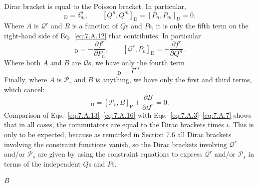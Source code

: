 Dirac bracket is equal to the Poisson bracket. In particular,
\begin{equation}
  [Q^n,P_m]_{\mathrm D}=\delta^n_m,\qquad
  [Q^n,Q^m]_{\mathrm D}=[P_n,P_m]_{\mathrm D}=0.
  \tag{7.A.13}\label{eq:7.A.13}
\end{equation}
Where $A$ is $\mathcal{Q}^r$ and $B$ is a function of $Q$s and $P$s, it is
only the fifth term on the right-hand side of Eq.~\eqref{eq:7.A.12} that contributes.
In particular
\begin{equation}
  [\mathcal{Q}^r,Q^n]_{\mathrm D}=-\frac{\partial f^r}{\partial P_n},
  \qquad
  [\mathcal{Q}^r,P_n]_{\mathrm D}=+\frac{\partial f^r}{\partial Q^n}.
  \tag{7.A.14}\label{eq:7.A.14}
\end{equation}
Where both $A$ and $B$ are $\mathcal{Q}$s, we have only the fourth term
\begin{equation}
  [\mathcal{Q}^r,\mathcal{Q}^s]_{\mathrm D}=\Gamma^{rs}.
  \tag{7.A.15}\label{eq:7.A.15}
\end{equation}
Finally, where $A$ is $\mathcal{P}_r$ and $B$ is anything, we have only the
first and third terms, which cancel:
\begin{equation}
  [\mathcal{P}_r,B]_{\mathrm D}
  =[\mathcal{P}_r,B]_{\mathrm P}
  +\frac{\partial B}{\partial\mathcal{Q}^r}=0.
  \tag{7.A.16}\label{eq:7.A.16}
\end{equation}
Comparison of Eqs.~\eqref{eq:7.A.13}--\eqref{eq:7.A.16} with Eqs.~\eqref{eq:7.A.3}--\eqref{eq:7.A.7} shows that
in all cases, the commutators are equal to the Dirac brackets times $i$. This
is only to be expected, because as remarked in Section 7.6 all Dirac brackets
involving the constraint functions vanish, so the Dirac brackets involving
$\mathcal{Q}^r$ and/or $\mathcal{P}_s$ are given by using the constraint
equations to express $\mathcal{Q}^r$ and/or $\mathcal{P}_s$ in terms of the
independent $Q$s and $P$s.

\begin{center}
$B$
\end{center}

